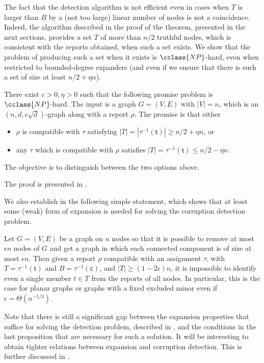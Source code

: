 \documentclass{toc}
\begin{document}
The fact that the detection algorithm is not efficient
even in cases when $T$ is larger than $B$ by a (not too large) 
linear number of nodes
%
%
is not a coincidence. Indeed, the algorithm described
in the proof of the theorem, presented
in the next sections, provides a set $T$ of more than $n/2$ truthful
nodes, which is consistent with the reports obtained, when such a
set exists. We show that the problem of producing
such a set when it exists is $\cclass{NP}$-hard,
even when restricted to bounded-degree expanders (and even if 
we ensure that there is such a set of size at least
$n/2+\eta n$).
\begin{theorem}
\label{t12}
%
There exist $c > 0, \eta > 0$ 
such that the following promise problem is 
$\cclass{NP}$-hard. The input is a graph $G=(V,E)$ with $|V| = n$, 
which is an $(n,d,c\sqrt{d})$-graph  
along with a report $\rho$. 
%
%
The promise is that either
\begin{itemize}
\item 
$\rho$ is compatible with $\tau$ satisfying  
$|T| = |\tau^{-1}(\mathsf{t})| \geq n/2 + \eta n$, or
\item 
any $\tau$ which is compatible with $\rho$ satisfies 
 $|T| = \tau^{-1}(\mathsf{t})  \leq n/2 - \eta n$. 
\end{itemize}
The objective is to distinguish between the two options above.
\end{theorem}
The proof is presented in .
%

We also establish in  the 
following simple statement, 
which shows that at least some
(weak) form of expansion is needed for solving the
corruption detection problem.
\begin{proposition}
\label{p13}
Let $G=(V,E)$ be a graph on $n$ nodes so that it is possible to
remove at most $\epsilon n$ nodes of $G$  and get a graph in which 
%
each   %
connected component is of size at most $\epsilon n$. Then given a report 
$\rho$ compatible with an assignment $\tau$, with $T = \tau^{-1}(\mathsf{t})$ and $B =  \tau^{-1}(\mathsf{c})$,
and $|T| \geq (1-2 \epsilon) n$, it is impossible to
identify even a single member $t \in T$ from the reports of
all nodes. In particular, this is the case for planar graphs or
graphs with a fixed excluded minor even if
$\epsilon=\Theta(n^{-1/3})$.
\end{proposition}

Note that there is still a significant gap between the expansion properties
that suffice for solving the detection problem, described in 
,  and the conditions in the last proposition that are
necessary for such a solution. It will be interesting to obtain tighter
relations between expansion and corruption detection. This is
further discussed in .
\end{document}
